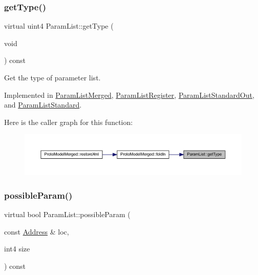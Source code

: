 \subsubsection{\texorpdfstring{getType()}{getType()}}
{\footnotesize\ttfamily virtual uint4 Param\+List\+::get\+Type (\begin{DoxyParamCaption}\item[{void}]{ }\end{DoxyParamCaption}) const\hspace{0.3cm}{\ttfamily [pure virtual]}}



Get the type of parameter list. 



Implemented in \mbox{\hyperlink{class_param_list_merged_a39f0621f7d34c4aa4d591fd51b2ab5fe}{Param\+List\+Merged}}, \mbox{\hyperlink{class_param_list_register_af11af105230d3d6bf2824ae8b6a527a6}{Param\+List\+Register}}, \mbox{\hyperlink{class_param_list_standard_out_a8d0f947ba2b94e2921712114d986f74f}{Param\+List\+Standard\+Out}}, and \mbox{\hyperlink{class_param_list_standard_a37193293ffb24b1206944e35ef64973c}{Param\+List\+Standard}}.

Here is the caller graph for this function\+:
\nopagebreak
\begin{figure}[H]
\begin{center}
\leavevmode
\includegraphics[width=350pt]{class_param_list_a9e3de5eb123af1ab9122de9f32e63859_icgraph}
\end{center}
\end{figure}
\mbox{\label{class_param_list_a77bf29c2bd3fe17be0e8200af97c50d9}} 
\subsubsection{\texorpdfstring{possibleParam()}{possibleParam()}}
{\footnotesize\ttfamily virtual bool Param\+List\+::possible\+Param (\begin{DoxyParamCaption}\item[{const \mbox{\hyperlink{class_address}{Address}} \&}]{loc,  }\item[{int4}]{size }\end{DoxyParamCaption}) const\hspace{0.3cm}{\ttfamily [pure virtual]}}



